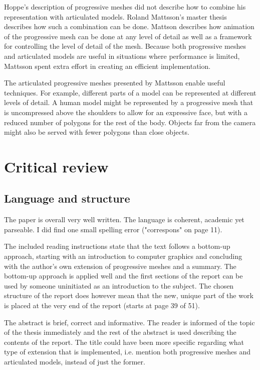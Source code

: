 \documentclass{article}
\begin{document}
Hoppe's description of progressive meshes did not describe how to combine his
representation with articulated models. Roland Mattsson's master thesis
describes how such a combination can be done. Mattson describes how animation of
the progressive mesh can be done at any level of detail as well as a framework
for controlling the level of detail of the mesh. Because both progressive meshes
and articulated models are useful in situations where performance is limited,
Mattsson spent extra effort in creating an efficient implementation.

The articulated progressive meshes presented by Mattsson enable useful
techniques. For example, different parts of a model can be represented at
different levels of detail. A human model might be represented by a progressive
mesh that is uncompressed above the shoulders to allow for an expressive face,
but with a reduced number of polygons for the rest of the body. Objects far from
the camera might also be served with fewer polygons than close objects.

\newpage

\section{Critical review}

\subsection{Language and structure}

The paper is overall very well written. The language is coherent, academic yet
parseable. I did find one small spelling error ("correspons" on page 11).

The included reading instructions state that the text follows a bottom-up
approach, starting with an introduction to computer graphics and concluding with
the author's own extension of progressive meshes and a summary. The bottom-up
approach is applied well and the first sections of the report can be used by
someone uninitiated as an introduction to the subject. The chosen structure of
the report does however mean that the new, unique part of the work is placed at
the very end of the report (starts at page 39 of 51).

The abstract is brief, correct and informative. The reader is informed of the
topic of the thesis immediately and the rest of the abstract is used describing
the contents of the report. The title could have been more specific regarding
what type of extension that is implemented, i.e. mention both progressive
meshes and articulated models, instead of just the former.
\end{document}
